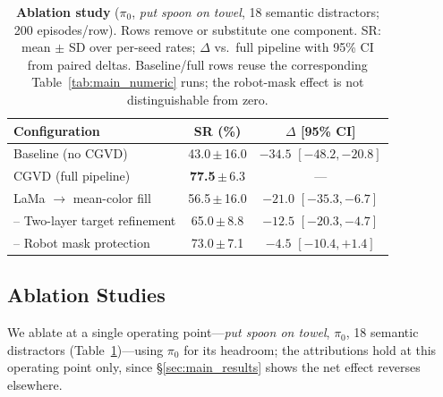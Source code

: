 \documentclass[letterpaper, 10 pt, conference]{ieeeconf}  %
\begin{document}

\begin{table}[t!]
\centering
\caption{ \textbf{Ablation study} ($\pi_0$, \textit{put spoon on towel}, 18 semantic distractors; 200 episodes/row). Rows remove or substitute one component. SR: mean $\pm$ SD over per-seed rates; $\Delta$ vs.\ full pipeline with 95\% CI from paired deltas. Baseline/full rows reuse the corresponding Table~\ref{tab:main_numeric} runs; the robot-mask effect is not distinguishable from zero.}
\label{tab:ablation}
\begin{tabular}{lcc}
\hline
\textbf{Configuration} & \textbf{SR (\%)} & \textbf{$\Delta$ [95\% CI]} \\
\hline
Baseline (no CGVD)        & 43.0\,$\pm$\,16.0 & $-34.5$ $[-48.2, -20.8]$ \\
CGVD (full pipeline)               & \textbf{77.5}\,$\pm$\,6.3 & --- \\
\quad LaMa $\rightarrow$ mean-color fill   & 56.5\,$\pm$\,16.0 & $-21.0$ $[-35.3, -6.7]$ \\
\quad -- Two-layer target refinement & 65.0\,$\pm$\,8.8 & $-12.5$ $[-20.3, -4.7]$ \\
\quad -- Robot mask protection     & 73.0\,$\pm$\,7.1 & $-4.5$ $[-10.4, +1.4]$ \\
\hline
\end{tabular}
\end{table}



\subsection{Ablation Studies}
\label{sec:ablation}
We ablate at a single operating point---\textit{put spoon on towel}, $\pi_0$, 18 semantic distractors (Table~\ref{tab:ablation})---using $\pi_0$ for its headroom; the attributions hold at this operating point only, since \S\ref{sec:main_results} shows the net effect reverses elsewhere.
\end{document}
